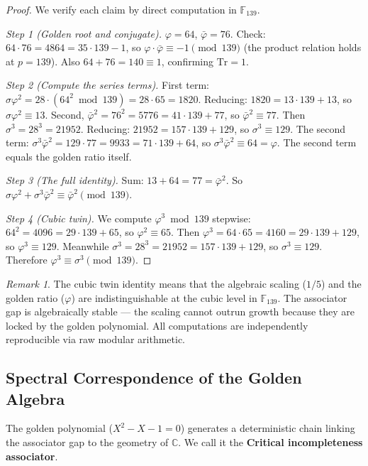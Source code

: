 \documentclass[12pt,oneside]{article}
\theoremstyle{principia}
\theoremstyle{definition}
\theoremstyle{remark}
\newtheorem{remark}[theorem]{Remark}
\providecommand{\CC}{\mathbb{C}}
\providecommand{\FF}{\mathbb{F}}
\providecommand{\vp}{\varphi}
\providecommand{\vpbar}{\bar{\varphi}}
\begin{document}
\begin{proof}
We verify each claim by direct computation in $\FF_{139}$.

\emph{Step 1 (Golden root and conjugate).} $\vp = 64$, $\vpbar = 76$. Check: $64 \cdot 76 = 4864 = 35 \cdot 139 - 1$, so $\vp \cdot \vpbar \equiv -1 \pmod{139}$ (the product relation holds at $p = 139$). Also $64 + 76 = 140 \equiv 1$, confirming $\mathrm{Tr} = 1$.

\emph{Step 2 (Compute the series terms).} First term: $\sigma \vp^2 = 28 \cdot (64^2 \bmod 139) = 28 \cdot 65 = 1820$. Reducing: $1820 = 13 \cdot 139 + 13$, so $\sigma \vp^2 \equiv 13$. Second, $\vpbar^2 = 76^2 = 5776 = 41 \cdot 139 + 77$, so $\vpbar^2 \equiv 77$. Then $\sigma^3 = 28^3 = 21952$. Reducing: $21952 = 157 \cdot 139 + 129$, so $\sigma^3 \equiv 129$. The second term: $\sigma^3 \vpbar^2 = 129 \cdot 77 = 9933 = 71 \cdot 139 + 64$, so $\sigma^3 \vpbar^2 \equiv 64 = \vp$. The second term equals the golden ratio itself.

\emph{Step 3 (The full identity).} Sum: $13 + 64 = 77 = \vpbar^2$. So $\sigma\vp^2 + \sigma^3\vpbar^2 \equiv \vpbar^2 \pmod{139}$.

\emph{Step 4 (Cubic twin).} We compute $\vp^3 \bmod 139$ stepwise: $64^2 = 4096 = 29 \cdot 139 + 65$, so $\vp^2 \equiv 65$. Then $\vp^3 = 64 \cdot 65 = 4160 = 29 \cdot 139 + 129$, so $\vp^3 \equiv 129$. Meanwhile $\sigma^3 = 28^3 = 21952 = 157 \cdot 139 + 129$, so $\sigma^3 \equiv 129$. Therefore $\vp^3 \equiv \sigma^3 \pmod{139}$. \qedhere
\end{proof}

\begin{remark}
The cubic twin identity means that the algebraic scaling ($1/5$) and the golden ratio ($\vp$) are indistinguishable at the cubic level in $\FF_{139}$. The associator gap is algebraically stable --- the scaling cannot outrun growth because they are locked by the golden polynomial. All computations are independently reproducible via raw modular arithmetic.
\end{remark}


\subsection{Spectral Correspondence of the Golden Algebra}

The golden polynomial ($X^2 - X - 1 = 0$) generates a deterministic chain linking the associator gap to the geometry of $\CC$. We call it the \textbf{Critical incompleteness associator}.
\end{document}
